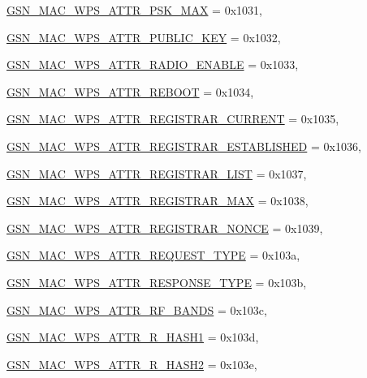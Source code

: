 \begin{DoxyCompactItemize}
\par
\hyperlink{a00642_gga0ae19d69a0b381d883890df8a7812414a58db76da0cc1255ce52bf6f152c2adfa}{GSN\_\-MAC\_\-WPS\_\-ATTR\_\-PSK\_\-MAX} =  0x1031, 
\par
\hyperlink{a00642_gga0ae19d69a0b381d883890df8a7812414a7e34100818d569f2b3ee549b38a2fe30}{GSN\_\-MAC\_\-WPS\_\-ATTR\_\-PUBLIC\_\-KEY} =  0x1032, 
\par
\hyperlink{a00642_gga0ae19d69a0b381d883890df8a7812414a7503378812e50f11419c9ef2ebf38cb4}{GSN\_\-MAC\_\-WPS\_\-ATTR\_\-RADIO\_\-ENABLE} =  0x1033, 
\par
\hyperlink{a00642_gga0ae19d69a0b381d883890df8a7812414a9e2fa8c3462ef0459ac59b542b30d73b}{GSN\_\-MAC\_\-WPS\_\-ATTR\_\-REBOOT} =  0x1034, 
\par
\hyperlink{a00642_gga0ae19d69a0b381d883890df8a7812414ae57635b08d409f68022e5dd31f2db238}{GSN\_\-MAC\_\-WPS\_\-ATTR\_\-REGISTRAR\_\-CURRENT} =  0x1035, 
\par
\hyperlink{a00642_gga0ae19d69a0b381d883890df8a7812414a5c0f743d2a7e9046503b1a12ef8fdbd1}{GSN\_\-MAC\_\-WPS\_\-ATTR\_\-REGISTRAR\_\-ESTABLISHED} =  0x1036, 
\par
\hyperlink{a00642_gga0ae19d69a0b381d883890df8a7812414a2ef5c33ca0d80654d41a318e2d8bbbb9}{GSN\_\-MAC\_\-WPS\_\-ATTR\_\-REGISTRAR\_\-LIST} =  0x1037, 
\par
\hyperlink{a00642_gga0ae19d69a0b381d883890df8a7812414a12357664da12b1300136c3987b234b9a}{GSN\_\-MAC\_\-WPS\_\-ATTR\_\-REGISTRAR\_\-MAX} =  0x1038, 
\par
\hyperlink{a00642_gga0ae19d69a0b381d883890df8a7812414ac72ed6c2511a4fe61f421fe8b97aa84d}{GSN\_\-MAC\_\-WPS\_\-ATTR\_\-REGISTRAR\_\-NONCE} =  0x1039, 
\par
\hyperlink{a00642_gga0ae19d69a0b381d883890df8a7812414a7976e11cc80f9fedaad827a78937ce43}{GSN\_\-MAC\_\-WPS\_\-ATTR\_\-REQUEST\_\-TYPE} =  0x103a, 
\par
\hyperlink{a00642_gga0ae19d69a0b381d883890df8a7812414afc565ba8593a669a97cec3a7ffd12286}{GSN\_\-MAC\_\-WPS\_\-ATTR\_\-RESPONSE\_\-TYPE} =  0x103b, 
\par
\hyperlink{a00642_gga0ae19d69a0b381d883890df8a7812414a61f9014364e3888a78f4f9e9f03cce18}{GSN\_\-MAC\_\-WPS\_\-ATTR\_\-RF\_\-BANDS} =  0x103c, 
\par
\hyperlink{a00642_gga0ae19d69a0b381d883890df8a7812414a34d93c9b4edc5be7a47a6797ff169a13}{GSN\_\-MAC\_\-WPS\_\-ATTR\_\-R\_\-HASH1} =  0x103d, 
\par
\hyperlink{a00642_gga0ae19d69a0b381d883890df8a7812414a896f51ad7da9054a9e30ecf48006aa23}{GSN\_\-MAC\_\-WPS\_\-ATTR\_\-R\_\-HASH2} =  0x103e, 

\end{DoxyCompactItemize}
